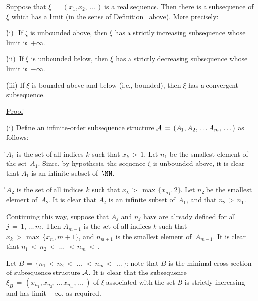 \V

        Suppose that ${\xi} \,=\, (x_{1},x_{2},\,{\ldots}\,)$ is a real sequence.
    Then there is a subsequence of ${\xi}$ which has a limit (in the sense of Definition~ above).
    More precisely:

\V


        \h (i)\,\, If ${\xi}$ is unbounded above, then ${\xi}$ has a strictly increasing subsequence whose limit is~$+{\infty}$.

       \h (ii)\, If ${\xi}$ is unbounded below, then ${\xi}$ has a strictly decreasing subsequence whose limit is~$-{\infty}$.

        \h (iii) If ${\xi}$ is bounded above and below (i.e., bounded), then ${\xi}$ has a convergent subsequence.

\V

        \underline{Proof}


\V

        (i) Define an infinite-order subsequence structure ${\cal A} \,=\, (A_{1},A_{2},\,{\ldots}\,A_{m},\,{\ldots}\,)$ as follows:

\VA

        \h $A_{1}$ is the set of all indices $k$ such that $x_{k}\,>\,1$. Let $n_{1}$ be the smallest element of the set~$A_{1}$.
    Since, by hypothesis, the sequence ${\xi}$ is unbounded above, it is clear that $A_{1}$ is an infinite subset of~${\NN}$.

        \h $A_{2}$ is the set of all indices $k$ such that $x_{k}\,>\,\max\,\{x_{n_{1}},2\}$.
    Let $n_{2}$ be the smallest element of~$A_{2}$. It is clear that $A_{2}$ is an infinite subset of~$A_{1}$, and that $n_{2}\,>\,n_{1}$.

        \h Continuing this way, suppose that $A_{j}$ and $n_{j}$ have are already defined for all $j \,=\, 1,\,{\ldots}\,m$.
    Then $A_{m+1}$ is the set of all indices $k$ such that $x_{k}\,>\,\max\,\{x_{m}, m+1\}$,
    and $n_{m+1}$ is the smallest element of~$A_{m+1}$. It is clear that $n_{1}\,<\,n_{2}\,<\,\,{\ldots}\,\,<\,n_{m}\,<\,$.

\VA

        Let $B \,=\, \{n_{1}\,<\,n_{2}\,<\,\,{\ldots}\,\,<\,n_{m}\,<\,\,{\ldots}\,\}$;
    note that $B$ is the minimal cross section of subsequence structure ${\cal A}$.
    It is clear that the subsequence ${\xi}_{B} \,=\, (x_{n_{1}}, x_{n_{2}},\,{\ldots}\,x_{n_{m}},\,{\ldots}\,)$ of ${\xi}$
    associated with the set $B$ is strictly increasing and has limit~$+{\infty}$, as required.



